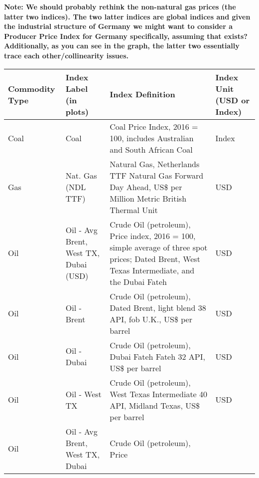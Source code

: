 \documentclass[
]{article}
\begin{document}
\textbf{Note: We should probably rethink the non-natural gas prices (the
latter two indices). The two latter indices are global indices and given
the industrial structure of Germany we might want to consider a Producer
Price Index for Germany specifically, assuming that exists?
Additionally, as you can see in the graph, the latter two essentially
trace each other/collinearity issues.}

\begin{longtable}[]{@{}
  >{\raggedright\arraybackslash}p{}
  >{\raggedright\arraybackslash}p{}
  >{\raggedright\arraybackslash}p{}
  >{\raggedright\arraybackslash}p{}@{}}
\toprule\noalign{}
\begin{minipage}[b]{\linewidth}\raggedright
Commodity Type
\end{minipage} & \begin{minipage}[b]{\linewidth}\raggedright
Index Label (in plots)
\end{minipage} & \begin{minipage}[b]{\linewidth}\raggedright
Index Definition
\end{minipage} & \begin{minipage}[b]{\linewidth}\raggedright
Index Unit (USD or Index)
\end{minipage} \\
\midrule\noalign{}
\endhead
\bottomrule\noalign{}
\endlastfoot
Coal & Coal & Coal Price Index, 2016 = 100, includes Australian and
South African Coal & Index \\
Gas & Nat. Gas (NDL TTF) & Natural Gas, Netherlands TTF Natural Gas
Forward Day Ahead, US\$ per Million Metric British Thermal Unit & USD \\
Oil & Oil - Avg Brent, West TX, Dubai (USD) & Crude Oil (petroleum),
Price index, 2016 = 100, simple average of three spot prices; Dated
Brent, West Texas Intermediate, and the Dubai Fateh & USD \\
Oil & Oil - Brent & Crude Oil (petroleum), Dated Brent, light blend 38
API, fob U.K., US\$ per barrel & USD \\
Oil & Oil - Dubai & Crude Oil (petroleum), Dubai Fateh Fateh 32 API,
US\$ per barrel & USD \\
Oil & Oil - West TX & Crude Oil (petroleum), West Texas Intermediate 40
API, Midland Texas, US\$ per barrel & USD \\
Oil & Oil - Avg Brent, West TX, Dubai & Crude Oil (petroleum), Price

\end{longtable}
\end{document}
